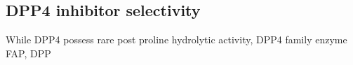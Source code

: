 \subsection{DPP4 inhibitor selectivity}
While DPP4 possess rare post proline hydrolytic activity, DPP4 family enzyme FAP, DPP
